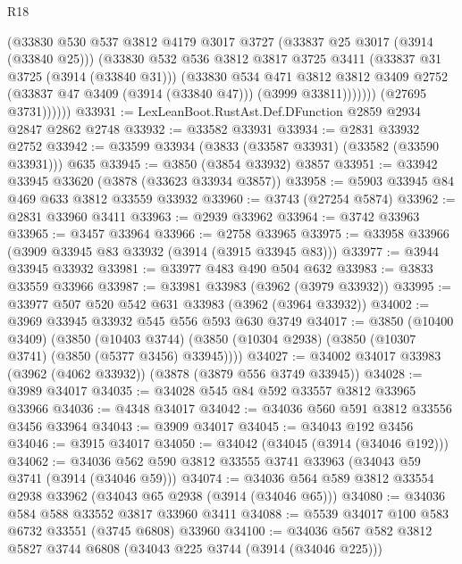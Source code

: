 \begin{lexlean}{R18}
\begin{coremodule}
                    (@33830
                      @530
                      @537
                      @3812
                      @4179
                      @3017
                      @3727
                      (@33837 @25 @3017 (@3914 (@33840 @25)))
                      (@33830
                        @532
                        @536
                        @3812
                        @3817
                        @3725
                        @3411
                        (@33837 @31 @3725 (@3914 (@33840 @31)))
                        (@33830
                          @534
                          @471
                          @3812
                          @3812
                          @3409
                          @2752
                          (@33837 @47 @3409 (@3914 (@33840 @47)))
                          (@3999 @33811)))))))
              (@27695 @3731))))))
@33931 := LexLeanBoot.RustAst.Def.DFunction @2859 @2934 @2847 @2862 @2748
@33932 := @33582 @33931
@33934 := @2831 @33932 @2752
@33942 := @33599 @33934 (@3833 (@33587 @33931) (@33582 (@33590 @33931))) @635
@33945 := @3850 (@3854 @33932) @3857
@33951 := @33942 @33945 @33620 (@3878 (@33623 @33934 @3857))
@33958 := @5903 @33945 @84 @469 @633 @3812 @33559 @33932
@33960 := @3743 (@27254 @5874)
@33962 := @2831 @33960 @3411
@33963 := @2939 @33962
@33964 := @3742 @33963
@33965 := @3457 @33964
@33966 := @2758 @33965
@33975 := @33958 @33966 (@3909 @33945 @83 @33932 (@3914 (@3915 @33945 @83)))
@33977 := @3944 @33945 @33932
@33981 := @33977 @483 @490 @504 @632
@33983 := @3833 @33559 @33966
@33987 := @33981 @33983 (@3962 (@3979 @33932))
@33995 := @33977 @507 @520 @542 @631 @33983 (@3962 (@3964 @33932))
@34002 := @3969 @33945 @33932 @545 @556 @593 @630 @3749
@34017 := @3850
    (@10400 @3409)
    (@3850
      (@10403 @3744)
      (@3850 (@10304 @2938) (@3850 (@10307 @3741) (@3850 (@5377 @3456) @33945))))
@34027 := @34002 @34017 @33983 (@3962 (@4062 @33932)) (@3878 (@3879 @556 @3749 @33945))
@34028 := @3989 @34017
@34035 := @34028 @545 @84 @592 @33557 @3812 @33965 @33966
@34036 := @4348 @34017
@34042 := @34036 @560 @591 @3812 @33556 @3456 @33964
@34043 := @3909 @34017
@34045 := @34043 @192 @3456
@34046 := @3915 @34017
@34050 := @34042 (@34045 (@3914 (@34046 @192)))
@34062 := @34036 @562 @590 @3812 @33555 @3741 @33963 (@34043 @59 @3741 (@3914 (@34046 @59)))
@34074 := @34036 @564 @589 @3812 @33554 @2938 @33962 (@34043 @65 @2938 (@3914 (@34046 @65)))
@34080 := @34036 @584 @588 @33552 @3817 @33960 @3411
@34088 := @5539 @34017 @100 @583 @6732 @33551 (@3745 @6808) @33960
@34100 := @34036 @567 @582 @3812 @5827 @3744 @6808 (@34043 @225 @3744 (@3914 (@34046 @225)))

\end{coremodule}
\end{lexlean}
